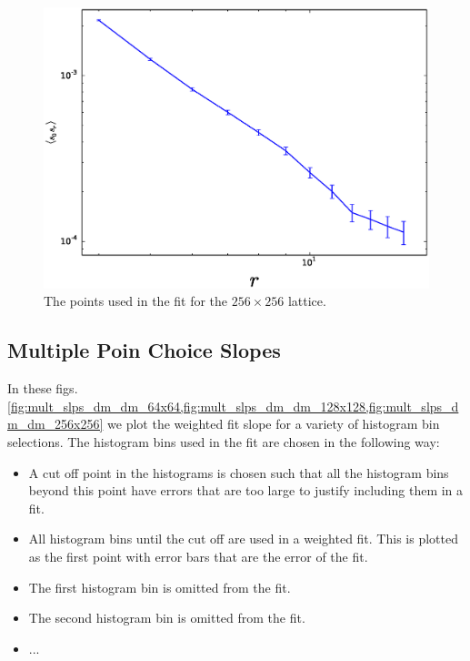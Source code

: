 \documentclass[aps,floatfix,11pt]{revtex4-1}
\begin{document}
\begin{figure}[h]
    \centering
    \includegraphics[width=8.5 cm]{fit_dm_dm_horz_ln_pnts_256x256}
    \caption{The points used in the fit for the $256\times256$ lattice.\label{fig:fit_dm_dm_256x256}}
\end{figure}

\subsection{Multiple Poin Choice Slopes}
In these figs. \ref{fig:mult_slps_dm_dm_64x64,fig:mult_slps_dm_dm_128x128,fig:mult_slps_dm_dm_256x256}
we plot the weighted fit slope for a variety of histogram bin selections. The
histogram bins used in the fit are chosen in the following way:

\begin{itemize}
    \item A cut off point in the histograms is chosen such that all the histogram bins beyond this
        point have errors that are too large to justify including them in a fit.
    \item All histogram bins until the cut off are used in a weighted fit. This is plotted as the first
        point with error bars that are the error of the fit.
    \item The first histogram bin is omitted from the fit.
    \item The second histogram bin is omitted from the fit.
    \item ...
\end{itemize}
\end{document}
